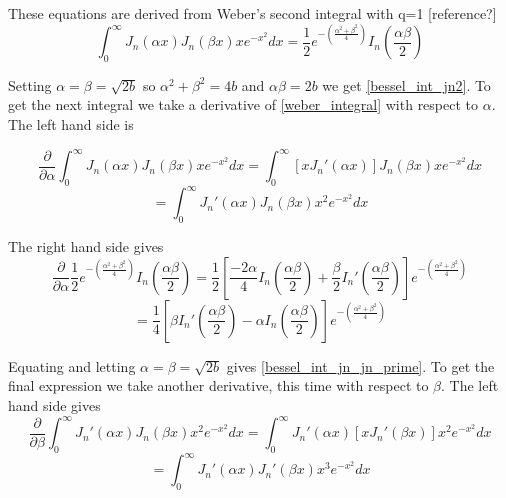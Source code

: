 These equations are derived from Weber's second integral with q=1 [reference?]
\begin{equation}\label{weber_integral}
	\int_0^\infty J_n \left(\alpha x \right) J_n \left( \beta x \right) xe^{-x^2} dx = \frac{1}{2} e^{-\left( \frac{ \alpha^2 + \beta^2 }{4} \right)} I_n \left( \frac{\alpha \beta}{2} \right)
\end{equation}

Setting $\alpha = \beta = \sqrt{2b}$ so $\alpha^2 + \beta^2 = 4b$ and $\alpha \beta = 2b$ we get \eqref{bessel_int_jn2}. To get the next integral we take a derivative of \eqref{weber_integral} with respect to $\alpha$. The left hand side is

\begin{equation*}
	\frac{\partial}{\partial \alpha} \int_0^\infty J_n \left(\alpha x \right) J_n \left( \beta x \right) xe^{-x^2} dx = \int_0^\infty \left[ x J_n' \left( \alpha x \right)  \right] J_n \left( \beta x \right)  xe^{-x^2} dx
\end{equation*}
\begin{equation}
	= \int_0^\infty J_n' \left( \alpha x \right) J_n \left( \beta x \right) x^2e^{-x^2} dx
\end{equation}

The right hand side gives
\begin{equation*}
	\frac{\partial}{\partial \alpha} \frac{1}{2} e^{-\left( \frac{ \alpha^2 + \beta^2 }{4} \right)} I_n \left( \frac{\alpha \beta}{2} \right) = \frac{1}{2} \left[ \frac{-2 \alpha}{4} I_n \left( \frac{\alpha \beta}{2} \right) + \frac{\beta}{2} I_n' \left( \frac{\alpha \beta}{2} \right) \right] e^{-\left( \frac{ \alpha^2 + \beta^2 }{4} \right)}
\end{equation*}
\begin{equation}
	= \frac{1}{4} \left[ \beta I_n' \left( \frac{\alpha \beta}{2} \right) - \alpha I_n \left( \frac{\alpha \beta}{2} \right) \right] e^{-\left( \frac{ \alpha^2 + \beta^2 }{4} \right)}
\end{equation}

Equating and letting $\alpha = \beta = \sqrt{2b}$ gives \eqref{bessel_int_jn_jn_prime}. To get the final expression we take another derivative, this time with respect to $\beta$. The left hand side gives
\begin{equation*}
	\frac{\partial}{\partial \beta} \int_0^\infty J_n' \left( \alpha x \right) J_n \left( \beta x \right) x^2e^{-x^2} dx = \int_0^\infty J_n' \left( \alpha x \right) \left[ x J_n' \left( \beta x \right) \right] x^2e^{-x^2} dx
\end{equation*}
\begin{equation}
	= \int_0^\infty J_n' \left( \alpha x \right) J_n' \left( \beta x \right) x^3e^{-x^2} dx
\end{equation}

